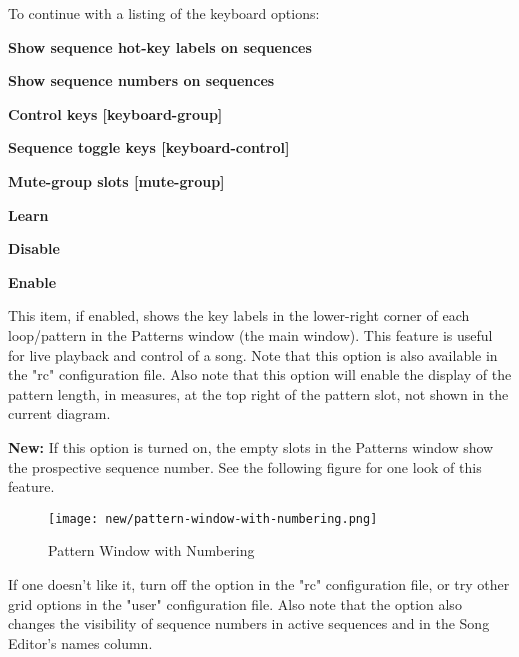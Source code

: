    To continue with a listing of the keyboard options:

   \begin{enumber}
      \item \textbf{Show sequence hot-key labels on sequences}
      \item \textbf{Show sequence numbers on sequences}
      \item \textbf{Control keys [keyboard-group]}
      \item \textbf{Sequence toggle keys [keyboard-control]}
      \item \textbf{Mute-group slots [mute-group]}
      \item \textbf{Learn}
      \item \textbf{Disable}
      \item \textbf{Enable}
   \end{enumber}

   \setcounter{ItemCounter}{0}      %

   This item, if enabled, shows the key labels in the lower-right corner of
   each loop/pattern in the Patterns window (the main window).  This feature is
   useful for live playback and control of a song.
   Note that this option is also available in the "rc" configuration file.
   Also note that this option will enable the display of the pattern length, in
   measures, at the top right of the pattern slot, not shown in the current
   diagram.

   \textbf{New:}
   If this option is turned on, the
   empty slots in the Patterns window show the prospective sequence number.
   See the following figure for one look of this feature.

\begin{figure}[H]
   \centering 
   \texttt{[image: new/pattern-window-with-numbering.png]}
   \caption{Pattern Window with Numbering}
   \label{fig:seq64_build_with_numbering}
\end{figure}

   If one doesn't like it, turn off the option in the "rc" configuration file,
   or try other grid options in the "user" configuration file.
   Also note that the option also changes the visibility of sequence numbers
   in active sequences and in the Song Editor's names column.

